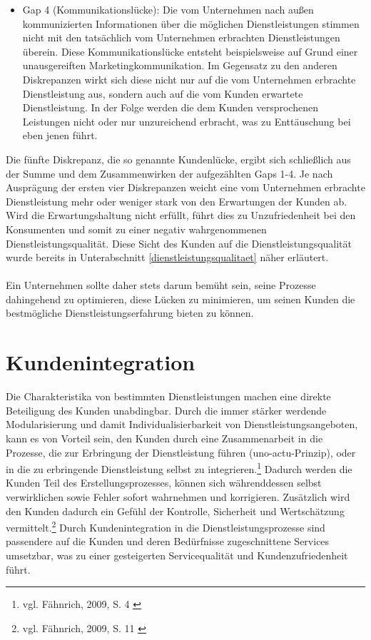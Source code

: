 \begin{itemize}
\item Gap 4 (Kommunikationslücke): Die vom Unternehmen nach außen kommunizierten Informationen über die möglichen Dienstleistungen stimmen nicht mit den tatsächlich vom Unternehmen erbrachten Dienstleistungen überein. Diese Kommunikationslücke entsteht beispielsweise auf Grund einer unausgereiften Marketingkommunikation. Im Gegensatz zu den anderen Diskrepanzen wirkt sich diese nicht nur auf die vom Unternehmen erbrachte Dienstleistung aus, sondern auch auf die vom Kunden erwartete Dienstleistung. In der Folge werden die dem Kunden versprochenen Leistungen nicht oder nur unzureichend erbracht, was zu Enttäuschung bei eben jenen führt.
\end{itemize}
\noindent Die fünfte Diskrepanz, die so genannte Kundenlücke, ergibt sich schließlich aus der Summe und dem Zusammenwirken der aufgezählten Gaps 1-4. Je nach Ausprägung der ersten vier Diskrepanzen weicht eine vom Unternehmen erbrachte Dienstleistung mehr oder weniger stark von den Erwartungen der Kunden ab. Wird die Erwartungshaltung nicht erfüllt, führt dies zu Unzufriedenheit bei den Konsumenten und somit zu einer negativ wahrgenommenen Dienstleistungsqualität. Diese Sicht des Kunden auf die Dienstleistungsqualität wurde bereits in Unterabschnitt \ref{dienstleistungsqualitaet} näher erläutert.
\\ \\
Ein Unternehmen sollte daher stets darum bemüht sein, seine Prozesse dahingehend zu optimieren, diese Lücken zu minimieren, um seinen Kunden die bestmögliche Dienstleistungserfahrung bieten zu können.
\section{Kundenintegration}
\label{kundenintegration}
Die Charakteristika von bestimmten Dienstleistungen machen eine direkte Beteiligung des Kunden unabdingbar. Durch die immer stärker werdende Modularisierung und damit Individualisierbarkeit von Dienstleistungsangeboten, kann es von Vorteil sein, den Kunden durch eine Zusammenarbeit in die Prozesse, die zur Erbringung der Dienstleistung führen (\glqq uno-actu\grqq -Prinzip), oder in die zu erbringende Dienstleistung selbst zu integrieren.\footnote{vgl. Fähnrich, 2009, S. 4 \cite{Faehnrich2009}}  Dadurch werden die Kunden Teil des Erstellungsprozesses, können sich währenddessen selbst verwirklichen sowie Fehler sofort wahrnehmen und korrigieren. Zusätzlich wird den Kunden dadurch ein Gefühl der Kontrolle, Sicherheit und Wertschätzung vermittelt.\footnote{vgl. Fähnrich, 2009, S. 11 \cite{Faehnrich2009}} Durch Kundenintegration in die Dienstleistungsprozesse sind passendere auf die Kunden und deren Bedürfnisse zugeschnittene Services umsetzbar, was zu einer gesteigerten Servicequalität und Kundenzufriedenheit führt.


